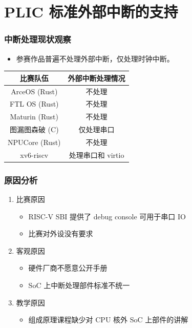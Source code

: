 \section{PLIC 标准外部中断的支持}

\begin{frame}
    \frametitle{中断处理现状观察}

    \begin{itemize}
        \item 参赛作品普遍不处理外部中断，仅处理时钟中断。
    \end{itemize}

    \begin{table}
        \centering
        \begin{tabular}{|c|c|}
            \hline \textbf{比赛队伍} & \textbf{外部中断处理情况} \\
            \hline ArceOS (Rust)     & 不处理                    \\
            \hline FTL OS (Rust)     & 不处理                    \\
            \hline Maturin (Rust)    & 不处理                    \\
            \hline 图漏图森破 (C)    & 仅处理串口                \\
            \hline NPUCore (Rust)    & 不处理                    \\
            \hline xv6-riscv         & 处理串口和 virtio         \\
            \hline
        \end{tabular}
    \end{table}


\end{frame}

\begin{frame}
    \frametitle{原因分析}

    \begin{enumerate}
        \item 比赛原因
              \begin{itemize}
                  \item RISC-V SBI 提供了 debug console 可用于串口 IO
                  \item 比赛对外设没有要求
              \end{itemize}
        \item 客观原因
              \begin{itemize}
                  \item 硬件厂商不愿意公开手册
                  \item SoC 上中断处理部件标准不统一
              \end{itemize}
        \item 教学原因
              \begin{itemize}
                  \item 组成原理课程缺少对 CPU 核外 SoC 上部件的讲解
              \end{itemize}
    \end{enumerate}


\end{frame}


